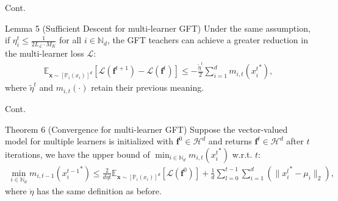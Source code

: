 \documentclass[aspectratio=169,xcolor=dvipsnames]{beamer}
\begin{document}
\begin{frame}{Cont.}
\begin{block}{Lemma 5 (Sufficient Descent for multi-learner GFT)} Under the same assumption, if $\eta^t_i\leq \frac{1}{2L_\mathcal{L}\cdot M_K}$ for all $i\in\mathbb{N}_d$, the GFT teachers can achieve a \alert{greater} reduction in the multi-learner loss $\mathcal{L}$:
	\begin{eqnarray}
		\mathbb{E}_{\bm{x}\sim[\mathbb{P}_i(x_i)]^d}\left[\mathcal{L}(\bm{f}^{t+1})-\mathcal{L}(\bm{f}^t)\right]\leq-\frac{\tilde{\eta}^t}{2}\sum_{i=1}^d m_{i,t}({x^t_i}^*),
	\end{eqnarray}
	where $\tilde{\eta}^t$ and $m_{i,t}(\cdot)$ retain their previous meaning.
\end{block} 
\end{frame}

\begin{frame}{Cont.}
\begin{block}{Theorem 6 (Convergence for multi-learner GFT)} Suppose the \alert{vector-valued} model for multiple learners is initialized with $\bm{f}^0\in\mathcal{H}^d$ and returns $\bm{f}^t\in\mathcal{H}^d$ after $t$ iterations, we have the \alert{upper bound} of $\min_{i\in\mathbb{N}_d} m_{i,t}({x^t_i}^*)$ w.r.t. $t$:
	\begin{eqnarray}\label{eqcgft}
		\min_{i\in\mathbb{N}_d} m_{i,t-1}({x^{t-1}_i}^*)\leq\frac{2}{d\dot{\eta}t}\mathbb{E}_{\bm{x}\sim[\mathbb{P}_i(x_i)]^d}\left[\mathcal{L}(\bm{f}^0)\right]+\frac{1}{d}\sum_{l=0}^{t-1}\sum_{i=1}^d \left(\|{x^l_i}^*-\mu_i\|_2\right),
	\end{eqnarray}
	where $\dot{\eta}$ has the same definition as before.
\end{block} 
\end{frame}
\end{document}
